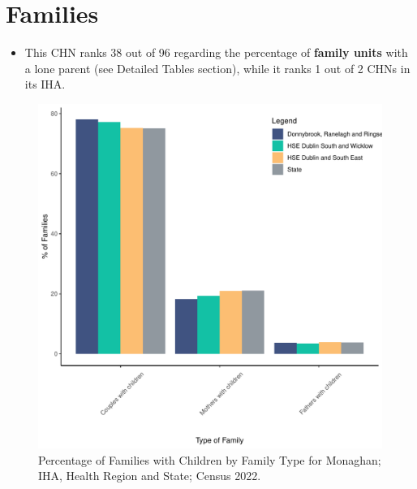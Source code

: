\documentclass{article}
\begin{document}
\section{Families}\label{sect:Fam}
\begin{itemize}
\item This CHN ranks  38 out of 96 regarding the percentage of \textbf{family units} with a lone parent (see Detailed Tables section), while it ranks   1 out of 2 CHNs in its IHA.
\end{itemize}
\begin{figure}[H]
	\centering
	\includegraphics[width = 150mm]{../figures/FamED.pdf}
	\caption{Percentage of Families with Children by Family Type for Monaghan; IHA, Health Region and State; Census 2022.}
	\label{fig:vbnv}
	\end{figure}
	
\end{document}
